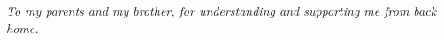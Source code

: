 \cleardoublepage
\begin{center}
\textit{To my parents and my brother, for understanding and supporting me from back home.}
\end{center}
